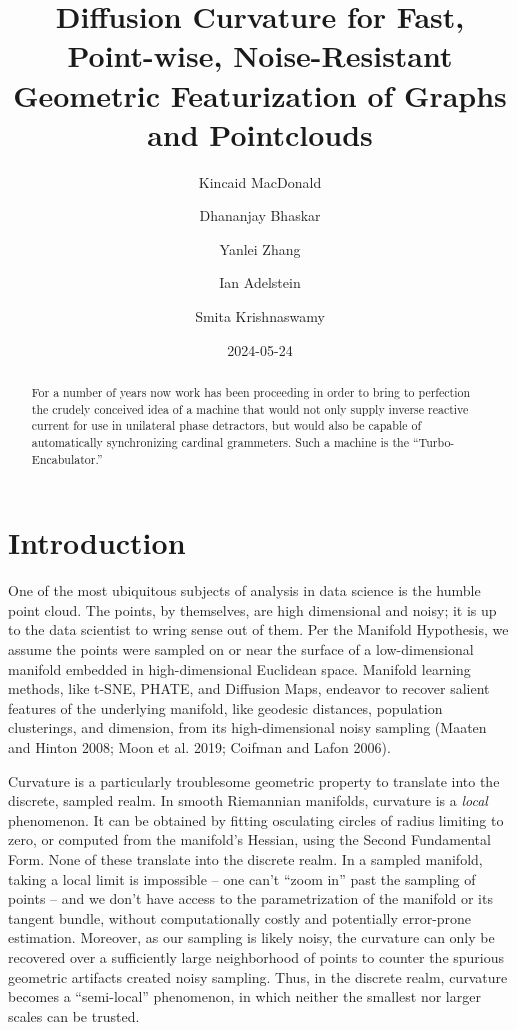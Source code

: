 \documentclass[
  letterpaper,
  DIV=11,
  numbers=noendperiod]{scrartcl}
\title{Diffusion Curvature for Fast, Point-wise, Noise-Resistant
Geometric Featurization of Graphs and Pointclouds}
\author{Kincaid MacDonald \and Dhananjay Bhaskar \and Yanlei
Zhang \and Ian Adelstein \and Smita Krishnaswamy}
\date{2024-05-24}
\theoremstyle{plain}
\theoremstyle{plain}
\theoremstyle{definition}
\theoremstyle{plain}
\theoremstyle{definition}
\theoremstyle{remark}
\begin{document}
\maketitle
\begin{abstract}
For a number of years now work has been proceeding in order to bring to
perfection the crudely conceived idea of a machine that would not only
supply inverse reactive current for use in unilateral phase detractors,
but would also be capable of automatically synchronizing cardinal
grammeters. Such a machine is the ``Turbo-Encabulator.''
\end{abstract}

\newcommand\Kaly[1]{\textcolor{blue}{Kaly: [[[#1]]]}}

\section{Introduction}\label{introduction}

One of the most ubiquitous subjects of analysis in data science is the
humble point cloud. The points, by themselves, are high dimensional and
noisy; it is up to the data scientist to wring sense out of them. Per
the Manifold Hypothesis, we assume the points were sampled on or near
the surface of a low-dimensional manifold embedded in high-dimensional
Euclidean space. Manifold learning methods, like t-SNE, PHATE, and
Diffusion Maps, endeavor to recover salient features of the underlying
manifold, like geodesic distances, population clusterings, and
dimension, from its high-dimensional noisy sampling (Maaten and Hinton
2008; Moon et al. 2019; Coifman and Lafon 2006).

Curvature is a particularly troublesome geometric property to translate
into the discrete, sampled realm. In smooth Riemannian manifolds,
curvature is a \emph{local} phenomenon. It can be obtained by fitting
osculating circles of radius limiting to zero, or computed from the
manifold's Hessian, using the Second Fundamental Form. None of these
translate into the discrete realm. In a sampled manifold, taking a local
limit is impossible -- one can't ``zoom in'' past the sampling of points
-- and we don't have access to the parametrization of the manifold or
its tangent bundle, without computationally costly and potentially
error-prone estimation. Moreover, as our sampling is likely noisy, the
curvature can only be recovered over a sufficiently large neighborhood
of points to counter the spurious geometric artifacts created noisy
sampling. Thus, in the discrete realm, curvature becomes a
``semi-local'' phenomenon, in which neither the smallest nor larger
scales can be trusted.
\end{document}

